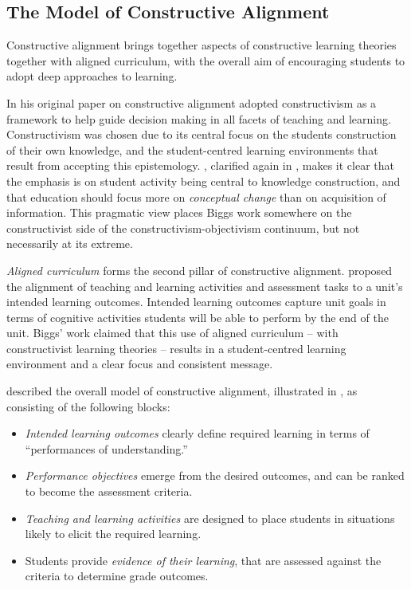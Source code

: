
\subsection{The Model of Constructive Alignment} %
\label{sub:the_model_of_constructive_alignment}

Constructive alignment brings together aspects of constructive learning theories together with aligned curriculum, with the overall aim of encouraging students to adopt deep approaches to learning.

In his original paper on constructive alignment \citet{Biggs:1996c} adopted constructivism as a framework to help guide decision making in all facets of teaching and learning. Constructivism was chosen due to its central focus on the students construction of their own knowledge, and the student-centred learning environments that result from accepting this epistemology. \citet{Biggs:1996c}, clarified again in \citet{Biggs:2007}, makes it clear that the emphasis is on student activity being central to knowledge construction, and that education should focus more on \emph{conceptual change} than on acquisition of information. This pragmatic view places Biggs work somewhere on the constructivist side of the constructivism-objectivism continuum, but not necessarily at its extreme. 

\emph{Aligned curriculum} forms the second pillar of constructive alignment. \citet{Biggs:1996c} proposed the alignment of teaching and learning activities and assessment tasks to a unit's intended learning outcomes. Intended learning outcomes capture unit goals in terms of cognitive activities students will be able to perform by the end of the unit. Biggs' work claimed that this use of aligned curriculum -- with constructivist learning theories -- results in a student-centred learning environment and a clear focus and consistent message.

\citet{Houghton:2004} described the overall model of constructive alignment, illustrated in , as consisting of the following blocks:
\begin{itemize}[noitemsep,nolistsep]
	\item \emph{Intended learning outcomes} clearly define required learning in terms of ``performances of understanding.''
	\item \emph{Performance objectives} emerge from the desired outcomes, and can be ranked to become the assessment criteria.
	\item \emph{Teaching and learning activities} are designed to place students in situations likely to elicit the required learning.
	\item Students provide \emph{evidence of their learning}, that are assessed against the criteria to determine grade outcomes.
\end{itemize}

